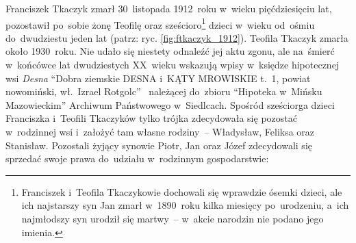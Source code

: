 Franciszek Tkaczyk zmarł
30~listopada 1912~roku w~wieku pięćdziesięciu lat, pozostawił po~sobie żonę
Teofilę oraz
sześcioro\footnote{Franciszek i~Teofila Tkaczykowie dochowali się wprawdzie
ósemki dzieci, ale ich najstarszy syn Jan zmarł w~1890~roku kilka miesięcy
po~urodzeniu, a~ich najmłodszy syn urodził się martwy~-- w~akcie narodzin nie
podano jego imienia.} dzieci w~wieku od~ośmiu do~dwudziestu jeden lat (patrz:
ryc. \ref{fig:ftkaczyk_1912}). Teofila Tkaczyk zmarła około 1930~roku. Nie
udało się niestety odnaleźć jej aktu zgonu, ale na~śmierć w~końcówce lat
dwudziestych XX~wieku wskazują wpisy w~księdze hipotecznej wsi \emph{Desna}
\enquote{Dobra ziemskie DESNA i~KĄTY MROWISKIE t.~1, powiat nowomiński,
wł.~Izrael Rotgolc}~\cite{desna1} należącej do~zbioru \enquote{Hipoteka
w~Mińsku Mazowieckim} Archiwum Państwowego w~Siedlcach. Spośród sześciorga
dzieci Franciszka i~Teofili Tkaczyków tylko trójka zdecydowała się pozostać
w~rodzinnej wsi i~założyć tam własne rodziny~--
Władysław,
Feliksa oraz
Stanisław. Pozostali
żyjący synowie Piotr,
Jan oraz
Józef zdecydowali się sprzedać swoje
prawa do~udziału w~rodzinnym gospodarstwie:

